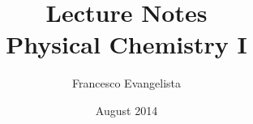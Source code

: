 \documentclass{../Main/lecturenotes}
\title{Lecture Notes \\ Physical Chemistry I}
\author{Francesco Evangelista}
\date{August 2014}
\begin{document}
\maketitle


\pagebreak
\graphicspath{{../02-BohrModel/}}


\pagebreak

\end{document}

